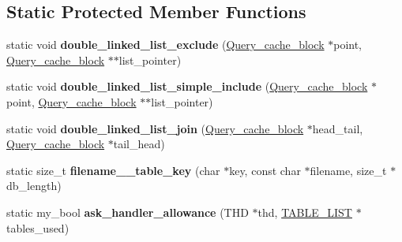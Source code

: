 \subsection*{Static Protected Member Functions}
\begin{DoxyCompactItemize}
\item 
\mbox{\label{classQuery__cache_aeb977b53aacec459bdb282cbc506bb1f}} 
static void {\bfseries double\+\_\+linked\+\_\+list\+\_\+exclude} (\mbox{\hyperlink{structQuery__cache__block}{Query\+\_\+cache\+\_\+block}} $\ast$point, \mbox{\hyperlink{structQuery__cache__block}{Query\+\_\+cache\+\_\+block}} $\ast$$\ast$list\+\_\+pointer)
\item 
\mbox{\label{classQuery__cache_accd60a1ec0f44d1f74f699c1d71ba192}} 
static void {\bfseries double\+\_\+linked\+\_\+list\+\_\+simple\+\_\+include} (\mbox{\hyperlink{structQuery__cache__block}{Query\+\_\+cache\+\_\+block}} $\ast$point, \mbox{\hyperlink{structQuery__cache__block}{Query\+\_\+cache\+\_\+block}} $\ast$$\ast$list\+\_\+pointer)
\item 
\mbox{\label{classQuery__cache_a6f674a2d5020c663dd7eb7ccbde5d7bc}} 
static void {\bfseries double\+\_\+linked\+\_\+list\+\_\+join} (\mbox{\hyperlink{structQuery__cache__block}{Query\+\_\+cache\+\_\+block}} $\ast$head\+\_\+tail, \mbox{\hyperlink{structQuery__cache__block}{Query\+\_\+cache\+\_\+block}} $\ast$tail\+\_\+head)
\item 
\mbox{\label{classQuery__cache_a3ecdcd323a41dbffb7a85f21541028c4}} 
static size\+\_\+t {\bfseries filename\+\_\+\_\+table\+\_\+key} (char $\ast$key, const char $\ast$filename, size\+\_\+t $\ast$db\+\_\+length)
\item 
\mbox{\label{classQuery__cache_aa76ae1dcbbb837cf0caf224c01315bbd}} 
static my\+\_\+bool {\bfseries ask\+\_\+handler\+\_\+allowance} (T\+HD $\ast$thd, \mbox{\hyperlink{structTABLE__LIST}{T\+A\+B\+L\+E\+\_\+\+L\+I\+ST}} $\ast$tables\+\_\+used)
\end{DoxyCompactItemize}
